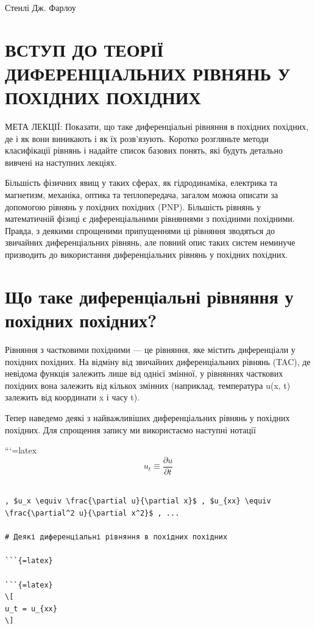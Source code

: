 \documentclass[
  ukrainian,
]{article}
\begin{document}
Стенлі Дж. Фарлоу

\section{ВСТУП ДО ТЕОРІЇ ДИФЕРЕНЦІАЛЬНИХ РІВНЯНЬ У ПОХІДНИХ
ПОХІДНИХ}\label{ux432ux441ux442ux443ux43f-ux434ux43e-ux442ux435ux43eux440ux456ux457-ux434ux438ux444ux435ux440ux435ux43dux446ux456ux430ux43bux44cux43dux438ux445-ux440ux456ux432ux43dux44fux43dux44c-ux443-ux43fux43eux445ux456ux434ux43dux438ux445-ux43fux43eux445ux456ux434ux43dux438ux445}

МЕТА ЛЕКЦІЇ: Показати, що таке диференціальні рівняння в похідних
похідних, де і як вони виникають і як їх розв'язують. Коротко розгляньте
методи класифікації рівнянь і надайте список базових понять, які будуть
детально вивчені на наступних лекціях.

Більшість фізичних явищ у таких сферах, як гідродинаміка, електрика та
магнетизм, механіка, оптика та теплопередача, загалом можна описати за
допомогою рівнянь у похідних похідних (PNP). Більшість рівнянь у
математичній фізиці є диференціальними рівняннями з похідними похідними.
Правда, з деякими спрощеними припущеннями ці рівняння зводяться до
звичайних диференціальних рівнянь, але повний опис таких систем неминуче
призводить до використання диференціальних рівнянь у похідних похідних.

\section{Що таке диференціальні рівняння у похідних
похідних?}\label{ux449ux43e-ux442ux430ux43aux435-ux434ux438ux444ux435ux440ux435ux43dux446ux456ux430ux43bux44cux43dux456-ux440ux456ux432ux43dux44fux43dux43dux44f-ux443-ux43fux43eux445ux456ux434ux43dux438ux445-ux43fux43eux445ux456ux434ux43dux438ux445}

Рівняння з частковими похідними --- це рівняння, яке містить
диференціали у похідних похідних. На відміну від звичайних
диференціальних рівнянь (TAC), де невідома функція залежить лише від
однієї змінної, у рівняннях часткових похідних вона залежить від кількох
змінних (наприклад, температура u(x, t) залежить від координати x і часу
t).

Тепер наведемо деякі з найважливіших диференціальних рівнянь у похідних
похідних. Для спрощення запису ми використаємо наступні нотації

```{=latex}
\[
u_t \equiv \frac{\partial u}{\partial t}
\]

\begin{verbatim}

, $u_x \equiv \frac{\partial u}{\partial x}$ , $u_{xx} \equiv \frac{\partial^2 u}{\partial x^2}$ , ...

# Деякі диференціальні рівняння в похідних похідних

```{=latex}

```{=latex}
\[
u_t = u_{xx}
\]
\end{verbatim}
\end{document}
